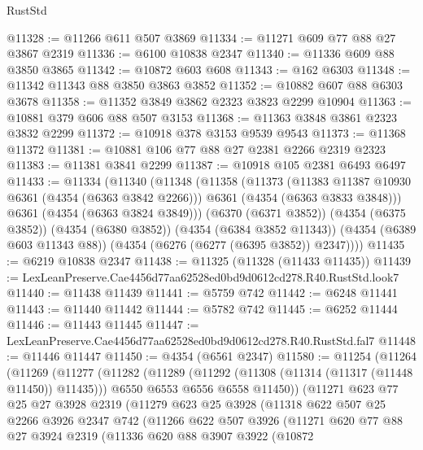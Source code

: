 \begin{lexlean}{RustStd}
\begin{coremodule}
@11328 := @11266 @611 @507 @3869
@11334 := @11271 @609 @77 @88 @27 @3867 @2319
@11336 := @6100 @10838 @2347
@11340 := @11336 @609 @88 @3850 @3865
@11342 := @10872 @603 @608
@11343 := @162 @6303
@11348 := @11342 @11343 @88 @3850 @3863 @3852
@11352 := @10882 @607 @88 @6303 @3678
@11358 := @11352 @3849 @3862 @2323 @3823 @2299 @10904
@11363 := @10881 @379 @606 @88 @507 @3153
@11368 := @11363 @3848 @3861 @2323 @3832 @2299
@11372 := @10918 @378 @3153 @9539 @9543
@11373 := @11368 @11372
@11381 := @10881 @106 @77 @88 @27 @2381 @2266 @2319 @2323
@11383 := @11381 @3841 @2299
@11387 := @10918 @105 @2381 @6493 @6497
@11433 := @11334
    (@11340
      (@11348
        (@11358
          (@11373
            (@11383 @11387 @10930 @6361 (@4354 (@6363 @3842 @2266)))
            @6361
            (@4354 (@6363 @3833 @3848)))
          @6361
          (@4354 (@6363 @3824 @3849)))
        (@6370 (@6371 @3852))
        (@4354 (@6375 @3852))
        (@4354 (@6380 @3852))
        (@4354 (@6384 @3852 @11343))
        (@4354 (@6389 @603 @11343 @88))
        (@4354 (@6276 (@6277 (@6395 @3852)) @2347))))
@11435 := @6219 @10838 @2347
@11438 := @11325 (@11328 (@11433 @11435))
@11439 := LexLeanPreserve.Cae4456d77aa62528ed0bd9d0612cd278.R40.RustStd.look7
@11440 := @11438 @11439
@11441 := @5759 @742
@11442 := @6248 @11441
@11443 := @11440 @11442
@11444 := @5782 @742
@11445 := @6252 @11444
@11446 := @11443 @11445
@11447 := LexLeanPreserve.Cae4456d77aa62528ed0bd9d0612cd278.R40.RustStd.fal7
@11448 := @11446 @11447
@11450 := @4354 (@6561 @2347)
@11580 := @11254
    (@11264
      (@11269
        (@11277
          (@11282
            (@11289
              (@11292 (@11308 (@11314 (@11317 (@11448 @11450)) @11435)))
              @6550
              @6553
              @6556
              @6558
              @11450))
          (@11271
            @623
            @77
            @25
            @27
            @3928
            @2319
            (@11279
              @623
              @25
              @3928
              (@11318
                @622
                @507
                @25
                @2266
                @3926
                @2347
                @742
                (@11266
                  @622
                  @507
                  @3926
                  (@11271
                    @620
                    @77
                    @88
                    @27
                    @3924
                    @2319
                    (@11336
                      @620
                      @88
                      @3907
                      @3922
                      (@10872

\end{coremodule}
\end{lexlean}
